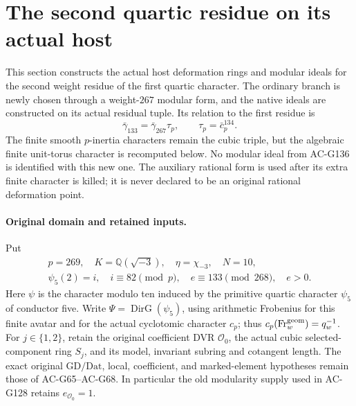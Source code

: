 \section{The second quartic residue on its actual host}
\label{sec:cubic-quartic-second-residue-actual-model}

This section constructs the actual host deformation rings and modular
ideals for the second weight residue of the first quartic character.
The ordinary branch is newly chosen through a weight-\(267\) modular
form, and the native ideals are constructed on its actual residual
tuple.  Its relation to the first residue is
\[
 \bar\gamma_{133}
      =\bar\gamma_{267}\tau_p,\qquad
                    \tau_p=\bar c_p^{134}.
\]
The finite smooth \(p\)-inertia characters remain the cubic triple,
but the algebraic finite unit-torus character is recomputed below.
No modular ideal from AC-G136 is identified with this new one.
The auxiliary rational form is used after its extra finite character
is killed; it is never declared to be an original rational
deformation point.

\paragraph{Original domain and retained inputs.}
Put
\[
 \begin{gathered}
 p=269,\quad K=\mathbb Q(\sqrt{-3}),\quad
 \eta=\chi_{-3},\quad N=10,\\
 \psi_5(2)=i,\quad i\equiv82\pmod p,\quad
 e\equiv133\pmod{268},\quad e>0.
 \end{gathered}
 \tag{G138.1}
\]
Here \(\psi\) is the character modulo ten induced by the
primitive quartic character \(\psi_5\) of conductor five.
Write \(\Psi=\operatorname{DirG}(\psi_5)\), using arithmetic
Frobenius for this finite avatar and for the actual cyclotomic
character \(c_p\); thus
\(c_p(\operatorname{Fr}^{\rm geom}_w)=q_w^{-1}\).
For \(j\in\{1,2\}\), retain the original coefficient DVR
\(\mathcal O_0\), the actual cubic selected-component ring
\(S_j\), and its model, invariant subring and cotangent length.
The exact original \(\mathrm{GD}/\mathrm{Dat}\), local,
coefficient, and marked-element hypotheses remain those of
AC-G65--AC-G68.  In particular the old modularity supply used
in AC-G128 retains \(e_{\mathcal O_0}=1\).

